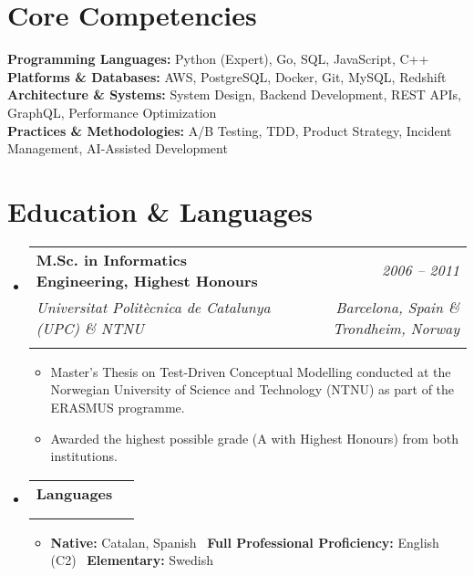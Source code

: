 \documentclass[a4paper,11pt]{article}
\makeatletter
\newcommand{\resumeItem}[1]{
  \item\small{
    {#1 \vspace{-2pt}}
  }
}
\newcommand{\resumeSubHeadingListStart}{\begin{itemize}[leftmargin=0.0in, label={}]}
\newcommand{\resumeSubHeadingListEnd}{\end{itemize}}
\newcommand{\resumeItemListStart}{\begin{itemize}}
\newcommand{\resumeItemListEnd}{\end{itemize}\vspace{-5pt}}
\newcommand{\resumeSubheadingSingleLine}[4]{
  \item
    \begin{tabular*}{\textwidth}{l@{\extracolsep{\fill}}r}
      \textbf{#1} & \textit{#2} \\
      \if\relax\detokenize{#3}\relax\else
        \textit{\small#3} & \textit{\small #4} \\
      \fi
    \end{tabular*}
    \vspace{-2pt}
}
\makeatother
\begin{document}
\vspace{0.5em plus 0.3em minus 0.2em}

\section{Core Competencies}
\begin{itemize}[leftmargin=0.05in, label={}]
    \small{\item{
        \textbf{Programming Languages:}{ \hfill Python (Expert), Go, SQL, JavaScript, C++} \\
        \textbf{Platforms \& Databases:}{ \hfill AWS, PostgreSQL, Docker, Git, MySQL, Redshift} \\
        \textbf{Architecture \& Systems:}{ \hfill System Design, Backend Development, REST APIs, GraphQL, Performance Optimization} \\
        \textbf{Practices \& Methodologies:}{ \hfill A/B Testing, TDD, Product Strategy, Incident Management, AI-Assisted Development} \\
    }}
\end{itemize}


\vspace{0.5em plus 0.3em minus 0.2em}


\section{Education \& Languages}
\resumeSubHeadingListStart
    \resumeSubheadingSingleLine %
        {M.Sc. in Informatics Engineering, \textbf{Highest Honours}}{2006 – 2011}
        {Universitat Politècnica de Catalunya (UPC) \& NTNU}{Barcelona, Spain \& Trondheim, Norway}
        \resumeItemListStart
            \resumeItem{Master's Thesis on Test-Driven Conceptual Modelling conducted at the Norwegian University of Science and Technology (NTNU) as part of the ERASMUS programme.}
            \resumeItem{Awarded the highest possible grade (A with Highest Honours) from both institutions.}
        \resumeItemListEnd

    \vspace{0.5em}
    \resumeSubheadingSingleLine %
        {Languages}{}
        {}{}
        \vspace{-1em}
        \resumeItemListStart
            \resumeItem{\textbf{Native:} Catalan, Spanish \textbullet\ \textbf{Full Professional Proficiency:} English (C2) \textbullet\ \textbf{Elementary:} Swedish}
        \resumeItemListEnd
\resumeSubHeadingListEnd

\vspace*{1.5em} 
\end{document}
